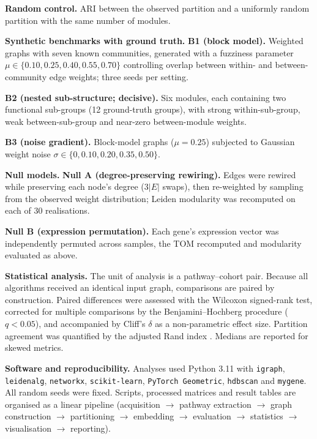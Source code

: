 \documentclass[twocolumn,10pt,a4paper]{article}
\begin{document}
\noindent\textbf{Random control.} ARI between the observed partition and a uniformly random
partition with the same number of modules.

\noindent\textbf{Synthetic benchmarks with ground truth.} \noindent\textbf{B1 (block model).} Weighted graphs with seven known communities, generated
with a fuzziness parameter $\mu\in\{0.10,0.25,0.40,0.55,0.70\}$ controlling overlap between
within- and between-community edge weights; three seeds per setting.

\noindent\textbf{B2 (nested sub-structure; decisive).} Six modules, each containing two
functional sub-groups (12 ground-truth groups), with strong within-sub-group, weak
between-sub-group and near-zero between-module weights.

\noindent\textbf{B3 (noise gradient).} Block-model graphs ($\mu=0.25$) subjected to
Gaussian weight noise $\sigma\in\{0,0.10,0.20,0.35,0.50\}$.

\noindent\textbf{Null models.} \noindent\textbf{Null A (degree-preserving rewiring).} Edges were rewired while preserving
each node's degree ($3|E|$ swaps), then re-weighted by sampling from the observed weight
distribution; Leiden modularity was recomputed on each of 30 realisations.

\noindent\textbf{Null B (expression permutation).} Each gene's expression vector was
independently permuted across samples, the TOM recomputed and modularity evaluated as above.

\noindent\textbf{Statistical analysis.} The unit of analysis is a pathway--cohort pair. Because all algorithms received an identical
input graph, comparisons are paired by construction. Paired differences were assessed with
the Wilcoxon signed-rank test, corrected for multiple comparisons by the
Benjamini--Hochberg procedure \citep{benjamini1995fdr} ($q<0.05$), and accompanied by
Cliff's $\delta$ \citep{cliff1993dominance} as a non-parametric effect size. Partition
agreement was quantified by the adjusted Rand index \citep{hubert1985ari}. Medians are reported for skewed metrics.

\noindent\textbf{Software and reproducibility.} Analyses used Python 3.11 with \texttt{igraph}, \texttt{leidenalg}, \texttt{networkx},
\texttt{scikit-learn}, \texttt{PyTorch Geometric}, \texttt{hdbscan} and \texttt{mygene}.
All random seeds were fixed. Scripts, processed matrices and result tables are organised as
a linear pipeline (acquisition $\rightarrow$ pathway extraction $\rightarrow$ graph
construction $\rightarrow$ partitioning $\rightarrow$ embedding $\rightarrow$ evaluation
$\rightarrow$ statistics $\rightarrow$ visualisation $\rightarrow$ reporting).
\end{document}
